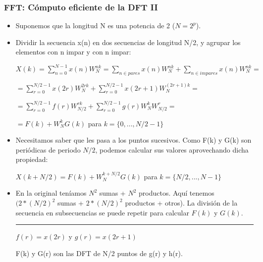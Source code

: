 

\begin{frame}
\frametitle{FFT: Cómputo eficiente de la DFT II}

\footnotesize




\begin{itemize}
\color{gray}
\item Suponemos que la longitud N es una potencia de 2 ($N=2^p$).
\item Dividir la secuencia x(n) en dos secuencias de longitud N/2, y agrupar los elementos con n impar y con n impar:

$X(k)=\sum_{n=0}^{N-1}x(n)W_N^{nk}=\sum_{n \in pares}  x(n)W_N^{nk} + \sum_{n \in impares}  x(n)W_N^{nk}=$

\hspace{0.8cm}$=\sum_{r=0}^{N/2-1} x(2r) W_N^{2rk}+\sum_{r=0}^{N/2-1} x(2r+1) W_N^{(2r+1)k}=$

\hspace{0.8cm}$=\sum_{r=0}^{N/2-1} f(r) W_{N/2}^{rk}+\sum_{r=0}^{N/2-1} g(r) W_N^k W_{N/2}^{r}=$

\hspace{0.8cm}$=F(k)+W_N^k G(k)$ para $k=\{0,...,N/2-1\}$

\item Necesitamos saber que les pasa a los puntos sucesivos. Como F(k) y G(k) son periódicas de periodo $N/2$, podemos calcular sus valores aprovechando dicha propiedad:

$X(k+N/2)=F(k)+W_N^{k+N/2} G(k)$ para $k=\{N/2,...,N-1\}$

\scriptsize
\item En la original teníamos $N^2$ sumas + $N^2$ productos. Aquí tenemos $(2*(N/2)^2$ sumas + $2*(N/2)^2$ productos + otros). La división de la secuencia en subsecuencias se puede repetir para  calcular $F(k)$ y $G(k)$.

\vspace{-0.2cm}


\rule{11cm}{0.4pt}

$f(r)=x(2r)$   y $g(r)=x(2r+1)$

F(k) y G(r) son las DFT de N/2 puntos de g(r) y h(r).


\end{itemize}
\end{frame}

